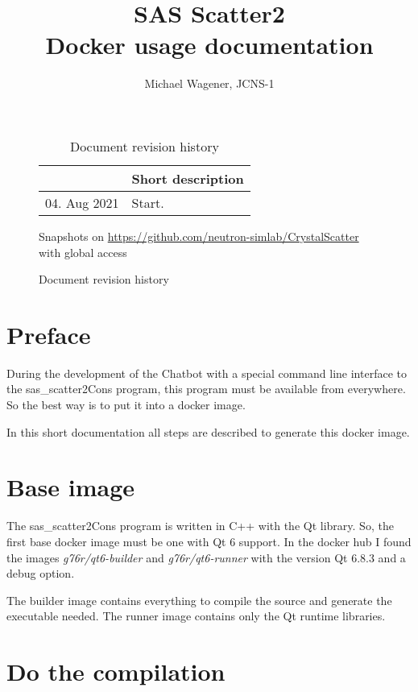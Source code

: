 \documentclass[11pt]{article} %
\author{Michael Wagener, JCNS-1}
\title{SAS Scatter2 \\[1ex] {\large Docker usage documentation}}
\begin{document}
\maketitle
\tableofcontents %

\begin{figure}[b] %
\begin{longtable}{|p{3cm}|p{12cm}|}
\caption{Document revision history} \\
\hline
\rowcolor{rowcolor}{\bf Date} & {\bf Short description} \\
\endfirsthead
\hline
04. Aug 2021 & Start. \\ \hline
\end{longtable}

\centerline{Snapshots on \url{https://github.com/neutron-simlab/CrystalScatter} with global access}
\end{figure}

\clearpage %


\section{Preface}

During the development of the Chatbot with a special command line interface to the sas\_scatter2Cons program, this program must be available from everywhere. So the best way is to put it into a docker image.

In this short documentation all steps are described to generate this docker image.


\section{Base image}

The sas\_scatter2Cons program is written in C++ with the Qt library. So, the first base docker image must be one with Qt 6 support. In the docker hub I found the images {\it g76r/qt6-builder} and {\it g76r/qt6-runner} with the version Qt 6.8.3 and a debug option.

The builder image contains everything to compile the source and generate the executable needed. The runner image contains only the Qt runtime libraries.


\section{Do the compilation} %
\end{document}
